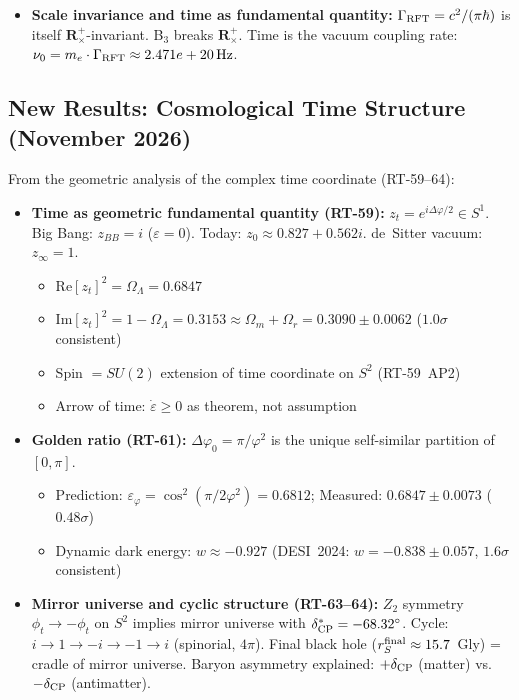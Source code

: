 \documentclass[12pt]{iopart}
\providecommand{\mathbb}[1]{\mathbf{#1}}
\begin{document}
\begin{itemize}
\begin{itemize}
		\item \textbf{Scale invariance and time as fundamental quantity:}
		$\Gamma_{\rm RFT}=c^2/(\pi\hbar)$ is itself $\mathbb{R}^+_\times$-invariant.
		B$_3$ breaks $\mathbb{R}^+_\times$. Time is the vacuum coupling rate:
		$\nu_0 = m_e \cdot \Gamma_{\rm RFT} \approx 2.471e+20\,{\rm Hz}$.
		\end{itemize}
	\end{itemize}
	
	\subsection{New Results: Cosmological Time Structure (November 2026)}
	\label{sec:time_geometric}
	
	From the geometric analysis of the complex time coordinate (RT-59--64):
	
	\begin{itemize}
		\item \textbf{Time as geometric fundamental quantity (RT-59):}
		$z_t = e^{i\Delta\varphi/2} \in S^1$. Big Bang: $z_{BB}=i$ ($\varepsilon=0$).
		Today: $z_0\approx0.827+0.562i$. de~Sitter vacuum: $z_\infty=1$.
		\begin{itemize}
			\item $\mathrm{Re}[z_t]^2 = \Omega_\Lambda = 0.6847$
			\item $\mathrm{Im}[z_t]^2 = 1-\Omega_\Lambda = 0.3153 \approx \Omega_m+\Omega_r = 0.3090\pm0.0062$
			($1.0\sigma$ consistent)
			\item Spin $= SU(2)$ extension of time coordinate on $S^2$ (RT-59~AP2)
			\item Arrow of time: $\dot\varepsilon\geq0$ as theorem, not assumption
		\end{itemize}
		
		\item \textbf{Golden ratio (RT-61):}
		$\Delta\varphi_0 = \pi/\varphi^2$ is the unique self-similar partition of $[0,\pi]$.
		\begin{itemize}
			\item Prediction: $\varepsilon_\varphi = \cos^2(\pi/2\varphi^2) = 0.6812$;
			Measured: $0.6847\pm0.0073$ ($0.48\sigma$)
			\item Dynamic dark energy: $w\approx-0.927$ (DESI~2024: $w=-0.838\pm0.057$,
			$1.6\sigma$ consistent)
		\end{itemize}
		
		\item \textbf{Mirror universe and cyclic structure (RT-63--64):}
		$Z_2$ symmetry $\phi_t\to-\phi_t$ on $S^2$ implies mirror universe with
		$\delta_{\rm CP}^*=-68.32^\circ$. Cycle: $i\to1\to{-i}\to{-1}\to i$ (spinorial, $4\pi$).
		Final black hole ($r_S^{\rm final}\approx15.7$~Gly) = cradle of mirror universe.
		Baryon asymmetry explained: $+\delta_{\rm CP}$ (matter) vs.\ $-\delta_{\rm CP}$ (antimatter).
	\end{itemize}
	
\end{document}
